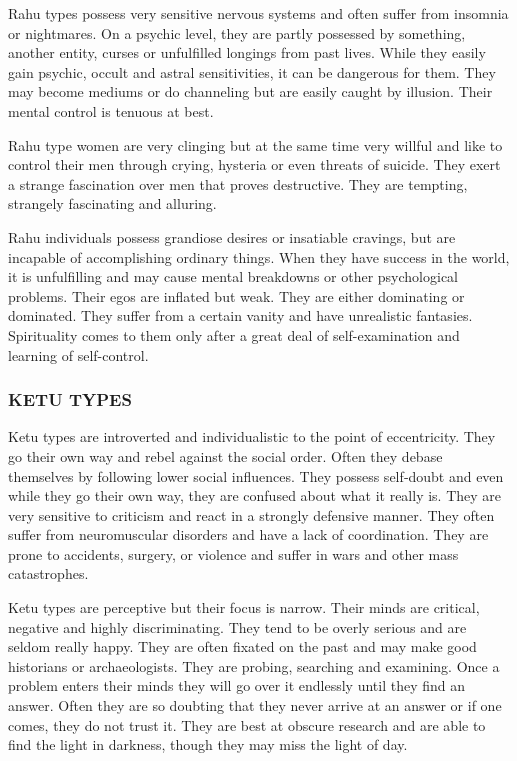  

Rahu types possess very sensitive nervous systems and often suffer from insomnia or nightmares. On a psychic level, they are partly possessed by something, another entity, curses or unfulfilled longings from past lives. While they easily gain psychic, occult and astral sensitivities, it can be dangerous for them. They may become mediums or do channeling but are easily caught by illusion. Their mental control is tenuous at best.

 

Rahu type women are very clinging but at the same time very willful and like to control their men through crying, hysteria or even threats of suicide. They exert a strange fascination over men that proves destructive. They are tempting, strangely fascinating and alluring.

 

Rahu individuals possess grandiose desires or insatiable cravings, but are incapable of accomplishing ordinary things. When they have success in the world, it is unfulfilling and may cause mental breakdowns or other psychological problems. Their egos are inflated but weak. They are either dominating or dominated. They suffer from a certain vanity and have unrealistic fantasies. Spirituality comes to them only after a great deal of self-examination and learning of self-control.

 



\subsubsection{KETU TYPES}
 

Ketu types are introverted and individualistic to the point of eccentricity. They go their own way and rebel against the social order. Often they debase themselves by following lower social influences. They possess self‑doubt and even while they go their own way, they are confused about what it really is. They are very sensitive to criticism and react in a strongly defensive manner. They often suffer from neuromuscular disorders and have a lack of coordination. They are prone to accidents, surgery, or violence and suffer in wars and other mass catastrophes.

 

Ketu types are perceptive but their focus is narrow. Their minds are critical, negative and highly discriminating. They tend to be overly serious and are seldom really happy. They are often fixated on the past and may make good historians or archaeologists. They are probing, searching and examining. Once a problem enters their minds they will go over it endlessly until they find an answer. Often they are so doubting that they never arrive at an answer or if one comes, they do not trust it. They are best at obscure research and are able to find the light in darkness, though they may miss the light of day.

